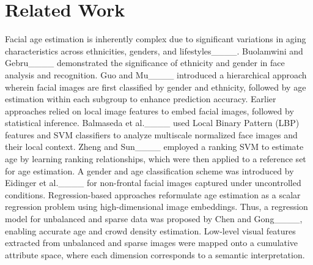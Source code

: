 \section{Related Work}
Facial age estimation is inherently complex due to significant variations in
aging characteristics across ethnicities, genders, and
lifestyles____. Buolamwini and Gebru____ demonstrated
the significance of ethnicity and gender in face analysis and recognition. Guo
and Mu____ introduced a hierarchical approach wherein facial
images are first classified by gender and ethnicity, followed by age
estimation within each subgroup to enhance prediction accuracy. Earlier
approaches relied on local image features to embed facial images, followed by
statistical inference. Balmaseda et al.____ used Local
Binary Pattern (LBP) features and SVM classifiers to analyze multiscale
normalized face images and their local context. Zheng and
Sun____ employed a ranking SVM to estimate age by learning
ranking relationships, which were then applied to a reference set for age
estimation. A gender and age classification scheme was introduced by Eidinger
et al.____ for non-frontal facial images captured under
uncontrolled conditions. Regression-based approaches reformulate age
estimation as a scalar regression problem using high-dimensional image
embeddings. Thus, a regression model for unbalanced and sparse data was
proposed by Chen and Gong____, enabling accurate age and crowd
density estimation. Low-level visual features extracted from unbalanced and
sparse images were mapped onto a cumulative attribute space, where each
dimension corresponds to a semantic interpretation.


